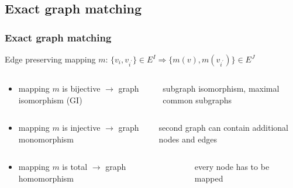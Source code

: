 \documentclass[handout]{beamer}
\begin{document}
\subsection{Exact graph matching}
\begin{frame}[allowframebreaks]
\frametitle{Exact graph matching}
Edge preserving mapping $m$:
$\{v_i,v_{i^\prime}\}\in E^I\Rightarrow\{m(v),m(v_{i^\prime})\}\in E^J$ %

\vspace{10pt}
\begin{minipage}[0.2\textheight]{\textwidth}
	\begin{columns}[T]
		\begin{column}{0.6\textwidth}
			\begin{itemize}
			\item mapping $m$ is bijective $\rightarrow$ graph isomorphism (GI)
			\end{itemize}
		\end{column}
		\begin{column}{0.3\textwidth}
			{\tiny subgraph isomorphism, maximal common subgraphs}
		\end{column}
	\end{columns}
\end{minipage}

\vspace{10pt}
\begin{minipage}[0.2\textheight]{\textwidth}
	\begin{columns}[T]
		\begin{column}{0.6\textwidth}
			\begin{itemize}
			\item mapping $m$ is injective $\rightarrow$ graph monomorphism
			\end{itemize}
		\end{column}
		\begin{column}{0.3\textwidth}
			{\tiny second graph can contain additional nodes and edges}
		\end{column}
	\end{columns}
\end{minipage}

\vspace{10pt}
\begin{minipage}[0.2\textheight]{\textwidth}
	\begin{columns}[T]
		\begin{column}{0.6\textwidth}
			\begin{itemize}
			\item mapping $m$ is total\hspace{15pt} $\rightarrow$ graph homomorphism
			\end{itemize}
		\end{column}
		\begin{column}{0.3\textwidth}
			{\tiny every node has to be mapped}
		\end{column}
	\end{columns}
\end{minipage}


\end{frame}
\end{document}
